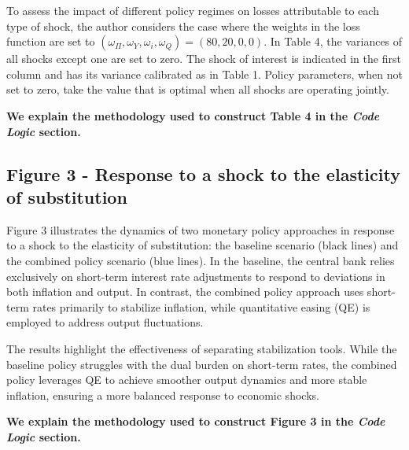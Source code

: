 \documentclass[12pt]{article}
\begin{document}
To assess the impact of different policy regimes on losses attributable to each type of shock, the author considers the case where the weights in the loss function are set to $(\omega_{\Pi}, \omega_{Y}, \omega_{i}, \omega_{Q}) = (80, 20, 0, 0)$. In Table 4, the variances of all shocks except one are set to zero. The shock of interest is indicated in the first column and has its variance calibrated as in Table 1. Policy parameters, when not set to zero, take the value that is optimal when all shocks are operating jointly.

\textbf{We explain the methodology used to construct Table 4 in the \textit{Code Logic} section.}
















\subsection*{Figure 3 - Response to a shock to the elasticity of substitution}


Figure 3 illustrates the dynamics of two monetary policy approaches in response to a shock to the elasticity of substitution: the baseline scenario (black lines) and the combined policy scenario (blue lines). In the baseline, the central bank relies exclusively on short-term interest rate adjustments to respond to deviations in both inflation and output. In contrast, the combined policy approach uses short-term rates primarily to stabilize inflation, while quantitative easing (QE) is employed to address output fluctuations.


The results highlight the effectiveness of separating stabilization tools. While the baseline policy struggles with the dual burden on short-term rates, the combined policy leverages QE to achieve smoother output dynamics and more stable inflation, ensuring a more balanced response to economic shocks.

\textbf{We explain the methodology used to construct Figure 3 in the \textit{Code Logic} section.}
\end{document}
